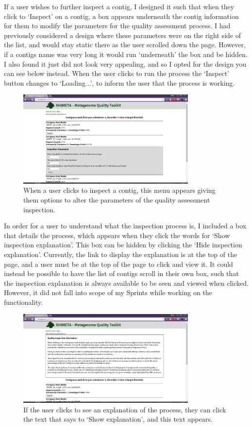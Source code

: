 If a user wishes to further inspect a contig, I designed it such that when they click to `Inspect' on a contig, a box appears underneath the contig information for them to modify the parameters for the quality assessment process. I had previously considered a design where these parameters were on the right side of the list, and would stay static there as the user scrolled down the page. However, if a contigs name was very long it would run `underneath' the box and be hidden. I also found it just did not look very appealing, and so I opted for the design you can see below instead. When the user clicks to run the process the `Inspect' button changes to `Loading...', to inform the user that the process is working.

\begin{figure}[H]
	\centering
\includegraphics[width=0.8\textwidth]{images/ui3}
\caption{When a user clicks to inspect a contig, this menu appears giving them options to alter the parameters of the quality assessment inspection.}
\end{figure}

In order for a user to understand what the inspection process is, I included a box that details the process, which appears when they click the words for `Show inspection explanation'. This box can be hidden by clicking the `Hide inspection explanation'. Currently, the link to display the explanation is at the top of the page, and a user must be at the top of the page to click and view it. It could instead be possible to have the list of contigs scroll in their own box, such that the inspection explanation is always available to be seen and viewed when clicked. However, it did not fall into scope of my Sprints while working on the functionality.

\begin{figure}[H]
	\centering
\includegraphics[width=0.8\textwidth]{images/ui4}
\caption{If the user clicks to see an explanation of the process, they can click the text that says to `Show explanation', and this text appears.}
\end{figure}

